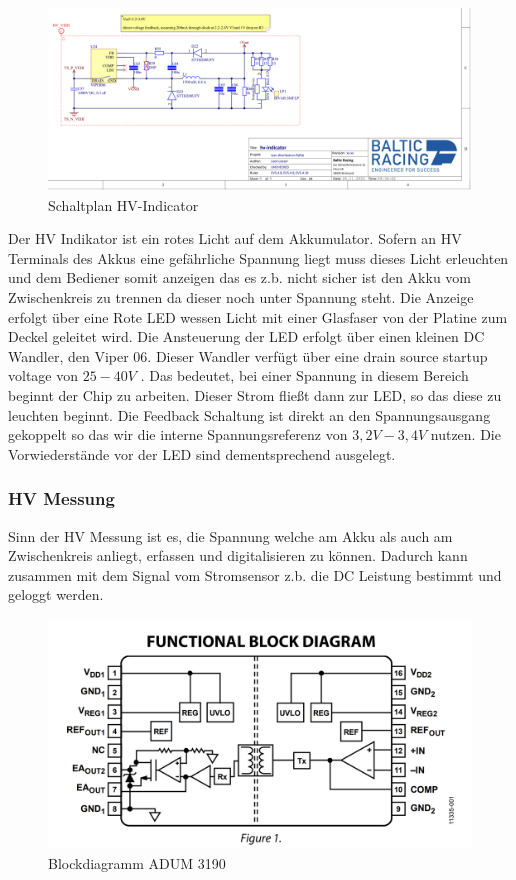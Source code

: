 \begin{figure}
	\centering
	\includegraphics[width=0.7\linewidth]{bilder/HV_indicator_schematic}
	\caption{Schaltplan \ac{HV}-Indicator}
	\label{fig:hvindicatorschematic}
\end{figure}

Der \ac{HV} Indikator ist ein rotes Licht auf dem Akkumulator. Sofern an \ac{HV} Terminals des Akkus eine gefährliche Spannung liegt muss dieses Licht erleuchten und dem Bediener somit anzeigen das es z.b. nicht sicher ist den Akku vom Zwischenkreis zu trennen da dieser noch unter Spannung steht. Die Anzeige erfolgt über eine Rote LED wessen Licht mit einer Glasfaser von der Platine zum Deckel geleitet wird. Die Ansteuerung der LED erfolgt über einen kleinen DC Wandler, den Viper 06. Dieser Wandler verfügt über eine drain source startup voltage von \ensuremath{25-40V} \cite{Viper06}. Das bedeutet, bei einer Spannung in diesem Bereich beginnt der Chip zu arbeiten. Dieser Strom fließt dann zur LED, so das diese zu leuchten beginnt. Die Feedback Schaltung ist direkt an den Spannungsausgang gekoppelt so das wir die interne Spannungsreferenz von \ensuremath{3,2 V - 3,4 V} nutzen. Die Vorwiederstände vor der LED sind dementsprechend ausgelegt.

\FloatBarrier
\subsubsection{\ac{HV} Messung}
Sinn der \ac{HV} Messung ist es, die Spannung welche am Akku als auch am Zwischenkreis anliegt, erfassen und digitalisieren zu können. Dadurch kann zusammen mit dem Signal vom Stromsensor z.b. die DC Leistung bestimmt und geloggt werden. 

\begin{figure}
	\centering
	\includegraphics[width=0.4\linewidth]{"bilder/Blockdiagramm ADUM3190"}
	\caption{Blockdiagramm ADUM 3190}
	\label{fig:blockdiagramm-adum3190}
\end{figure}

